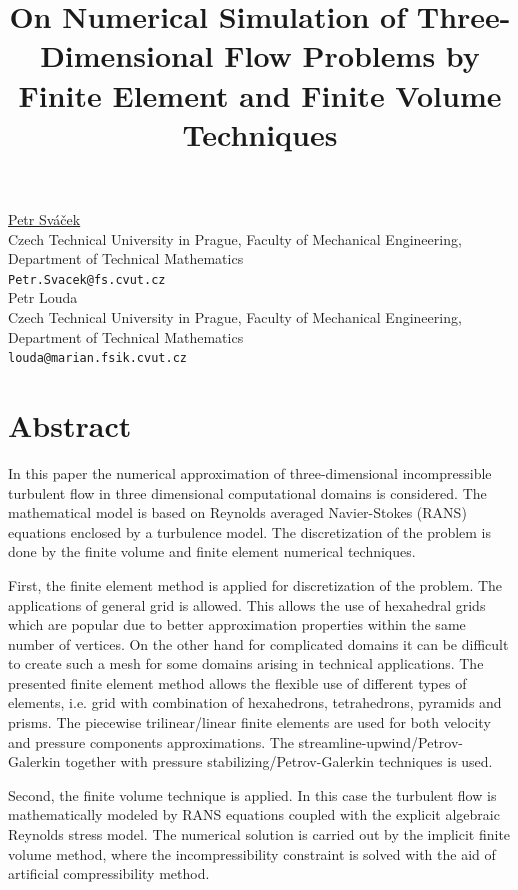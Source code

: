 \documentclass[article, A4, 11pt]{llncs}%
\begin{document}
\title{On Numerical Simulation of Three-Dimensional Flow Problems by Finite Element and Finite Volume Techniques}
 \author{} \institute{}
\maketitle
\begin{center}
{\large \underline{Petr Sváček}}\\
Czech Technical University in Prague, Faculty of Mechanical Engineering, Department of Technical Mathematics\\
{\tt Petr.Svacek@fs.cvut.cz}
\\ \vspace{4mm}
{\large Petr Louda}\\
Czech Technical University in Prague, Faculty of Mechanical Engineering, Department of Technical Mathematics\\
{\tt louda@marian.fsik.cvut.cz}
\end{center}

\section*{Abstract}
In this paper the numerical approximation of three-dimensional incompressible turbulent flow  in three dimensional computational domains is considered. The mathematical model is based on Reynolds averaged Navier-Stokes (RANS) equations enclosed by a turbulence model. The discretization of the problem is done by the finite volume and finite element numerical techniques.

First, the finite element method is applied for discretization of the problem. The applications of general grid is allowed. This allows the use of hexahedral grids  which are popular due to better approximation properties  within the same number of vertices. On the other hand for complicated domains it can be difficult to create such a mesh for some domains arising in technical applications. The presented finite element method allows the flexible use of different types of elements, i.e. grid with combination of hexahedrons, tetrahedrons, pyramids and prisms. The piecewise trilinear/linear finite elements are used for both velocity and pressure components approximations. The streamline-upwind/Petrov-Galerkin together with pressure stabilizing/Petrov-Galerkin techniques is used.

Second, the finite volume technique is applied. In this case the turbulent flow is  mathematically modeled by RANS equations coupled with the explicit algebraic Reynolds stress model. The numerical solution is carried out by the implicit finite volume method, where the incompressibility constraint is solved with the aid of artificial compressibility method.
\end{document}
